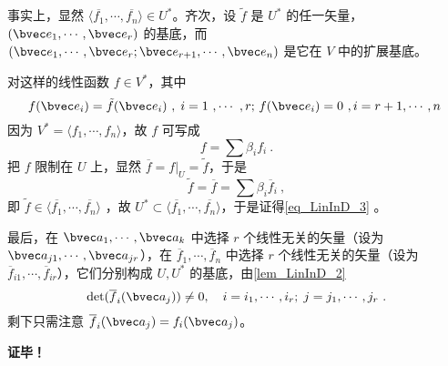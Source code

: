 事实上，显然 $\langle\overline{f_1},\cdots,\overline{f_n}\rangle \in U^*$。齐次，设 $\tilde f$ 是 $U^*$ 的任一矢量，$(\bvec e_1,\cdots,\bvec e_r)$ 的基底，而 $(\bvec e_1,\cdots,\bvec e_r;\bvec e_{r+1},\cdots,\bvec e_n)$ 是它在 $V$ 中的扩展基底。

对这样的线性函数 $f\in V^*$，其中 
\begin{equation}
f(\bvec e_i)=\tilde f(\bvec e_i)~,\;i=1~,\cdots ~,r;\, f(\bvec e_i)=0~,i=r+1,\cdots,n~
\end{equation}
因为 $V^*=\langle f_1,\cdots,f_n\rangle$，故 $f$ 可写成
\begin{equation}
f=\sum \beta_if_i~.
\end{equation}
把 $f$ 限制在 $U$ 上，显然 $\overline f=f|_U=\tilde f$，于是
\begin{equation}
\tilde f=\overline f=\sum \beta_i \overline f_i~,
\end{equation}
即 $\tilde f\in\langle\overline{f_1},\cdots,\overline{f_n}\rangle$ ，故 $U^*\subset\langle\overline{f_1},\cdots,\overline{f_n}\rangle$，于是证得\autoref{eq_LinInD_3} 。

最后，在 $\bvec a_1,\cdots,\bvec a_k$ 中选择 $r$ 个线性无关的矢量（设为 $\bvec a_{j1},\cdots,\bvec a_{jr} $），在 $\overline f_1,\cdots ,\overline f_n$ 中选择 $r$ 个线性无关的矢量（设为 $\overline f_{i1},\cdots,\overline f_{ir}$），它们分别构成 $U,U^*$ 的基底，由\autoref{lem_LinInD_2} 
\begin{equation}
\det(\overline f_i(\bvec a_j))\neq0,\quad i=i_1,\cdots ,i_r;\; j=j_1,\cdots,j_r~.
\end{equation}
剩下只需注意 $\overline f_i(\bvec a_j)=f_i(\bvec a_j)$。

\textbf{证毕！}